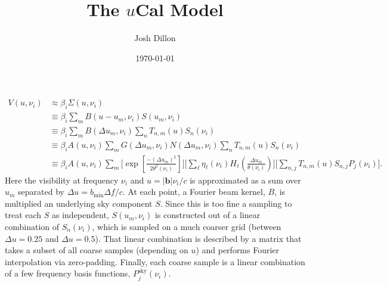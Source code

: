 \documentclass[]{article}
\begin{document}
\title{The $u$Cal Model}
\author{Josh Dillon}
\date{\today}
\maketitle


\begin{align}
V(u,\nu_i) &\approx \beta_i \Sigma(u,\nu_i) \\
& \equiv \beta_i \sum_m B(u-u_m,\nu_i) S(u_m,\nu_i) \\
& \equiv \beta_i \sum_m B(\Delta u_m,\nu_i) \sum_n T_{n,m}(u) S_n(\nu_i) \\
& \equiv \beta_i A(u,\nu_i) \sum_m G(\Delta u_m,\nu_i) N(\Delta u_m,\nu_i) \sum_n T_{n,m}(u) S_n(\nu_i)\\
& \equiv \beta_i  A(u,\nu_i) \sum_m \Bigg[ \exp\left[\frac{-(\Delta u_m)^2}{2\theta^2(\nu_i)}\right] \Bigg] \Bigg[ \sum_\ell \eta_\ell (\nu_i) H_\ell\left(\frac{\Delta u_m}{\theta(\nu_i)}\right) \Bigg] \Bigg[\sum_{n,j} T_{n,m}(u) S_{n,j} P_{j}(\nu_i) \Bigg].
\end{align}
Here the visibility at frequency $\nu_i$ and $u  = |\mathbf{b}|\nu_i/c$ is approximated as a sum over $u_m$ separated by $\Delta u = b_\text{min} \Delta f /c$. At each point, a Fourier beam kernel, $B$, is multiplied an underlying sky component $S$. Since this is too fine a sampling to treat each $S$ as independent, $S(u_m,\nu_i)$ is constructed out of a linear combination of $S_n(\nu_i)$, which is sampled on a much coarser grid (between $\Delta u = 0.25$ and $\Delta u = 0.5$). That linear combination is described by a matrix that takes a subset of all coarse samples (depending on $u$) and performs Fourier interpolation via zero-padding. Finally, each coarse sample is a linear combination of a few frequency basis functions, $P^\text{sky}_j(\nu_i)$.
\end{document}
